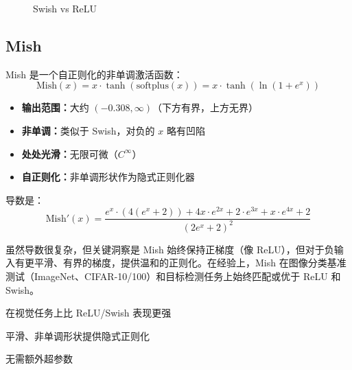 \begin{figure}[htbp]
    \centering
    \caption[Swish激活函数]{Swish vs ReLU}
    \label{fig:swish}
\end{figure}

\subsection{Mish}

Mish \cite{misra2019mish} 是一个自正则化的非单调激活函数：
\begin{equation}
\text{Mish}(x) = x \cdot \tanh(\text{softplus}(x)) = x \cdot \tanh(\ln(1 + e^x))
\end{equation}

\begin{properties}[Mish的性质]
\begin{itemize}
    \item \textbf{输出范围：}大约 $(-0.308, \infty)$（下方有界，上方无界）
    \item \textbf{非单调：}类似于 Swish，对负的 $x$ 略有凹陷
    \item \textbf{处处光滑：}无限可微（$C^\infty$）
    \item \textbf{自正则化：}非单调形状作为隐式正则化器
\end{itemize}
\end{properties}

导数是：
\begin{equation}
\text{Mish}'(x) = \frac{e^x \cdot (4(e^x + 2)) + 4x \cdot e^{2x} + 2 \cdot e^{3x} + x \cdot e^{4x} + 2}{(2e^x + 2)^2}
\end{equation}

虽然导数很复杂，但关键洞察是 Mish 始终保持正梯度（像 ReLU），但对于负输入有更平滑、有界的梯度，提供温和的正则化。在经验上，Mish 在图像分类基准测试（ImageNet、CIFAR-10/100）和目标检测任务上始终匹配或优于 ReLU 和 Swish。

\begin{advantages}
    \item 在视觉任务上比 ReLU/Swish 表现更强
    \item 平滑、非单调形状提供隐式正则化
    \item 无需额外超参数
\end{advantages}

